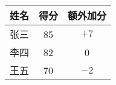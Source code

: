 \begin{tabu}{ccc}
\hline
\rowfont{\bfseries}
姓名 & 得分 & 额外加分 \\
\hline
张三 & 85 & $+7$ \\
\rowfont{\itshape}
李四 & 82 & 0 \\
王五 & 70 & $-2$ \\
\hline
\end{tabu}
